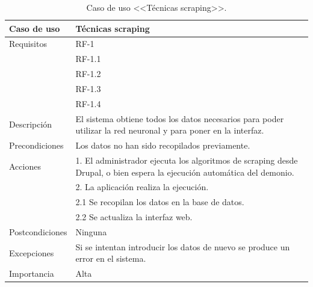  
\begin{table}
  \begin{center}
   \begin{tabular}{|p{3cm} | p{9cm} |}
    \hline
    Caso de uso & Técnicas scraping\\
    \hline
    Requisitos & RF-1\\
	    & RF-1.1\\
	    & RF-1.2\\
    	& RF-1.3\\
	    & RF-1.4\\
    \hline
    Descripción & El sistema obtiene todos los datos necesarios para poder utilizar la red neuronal y para poner en la interfaz.\\
    \hline
    Precondiciones & Los datos no han sido recopilados previamente.\\
    \hline
    Acciones & 1. El administrador ejecuta los algoritmos de scraping desde Drupal, o bien espera la ejecución automática del demonio. \\
    &2. La aplicación realiza la ejecución. \\
    &\hspace{1em} 2.1 Se recopilan los datos en la base de datos.\\
    &\hspace{1em} 2.2 Se actualiza la interfaz web.\\
    \hline
    Postcondiciones & Ninguna \\
    \hline
    Excepciones & Si se intentan introducir los datos de nuevo se produce un error en el sistema. \\
    \hline
    Importancia & Alta \\
    \hline
   \end{tabular}
   \caption{Caso de uso <<Técnicas scraping>>.}
   \label{tabla:casoUso1}
  \end{center}
 \end{table} 
 
